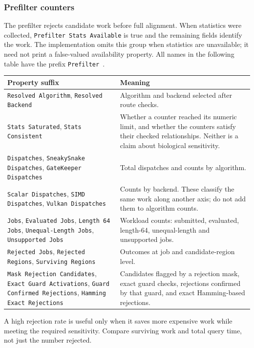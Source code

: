 \subsubsection{Prefilter counters}

The prefilter rejects candidate work before full alignment. When statistics
were collected, \texttt{Prefilter Stats Available} is true and the remaining
fields identify the work. The implementation omits this group when statistics
are unavailable; it need not print a false-valued availability property.
All names in the following table have the prefix \texttt{Prefilter }.

\begingroup\small
\begin{longtable}{@{}p{.49\linewidth}p{.46\linewidth}@{}}
\toprule
\textbf{Property suffix} & \textbf{Meaning}\\
\midrule\endhead
\texttt{Resolved Algorithm}, \texttt{Resolved Backend} & Algorithm and
backend selected after route checks.\\
\texttt{Stats Saturated}, \texttt{Stats Consistent} & Whether a counter
reached its numeric limit, and whether the counters satisfy their checked
relationships. Neither is a claim about biological sensitivity.\\
\texttt{Dispatches}, \texttt{SneakySnake Dispatches},
\texttt{GateKeeper Dispatches} & Total dispatches and counts by algorithm.\\
\texttt{Scalar Dispatches}, \texttt{SIMD Dispatches},
\texttt{Vulkan Dispatches} & Counts by backend. These classify the same
work along another axis; do not add them to algorithm counts.\\
\texttt{Jobs}, \texttt{Evaluated Jobs}, \texttt{Length 64 Jobs},
\texttt{Unequal-Length Jobs}, \texttt{Unsupported Jobs} & Workload counts:
submitted, evaluated, length-64, unequal-length and unsupported jobs.\\
\texttt{Rejected Jobs}, \texttt{Rejected Regions},
\texttt{Surviving Regions} & Outcomes at job and candidate-region level.\\
\texttt{Mask Rejection Candidates}, \texttt{Exact Guard Activations},
\texttt{Guard Confirmed Rejections}, \texttt{Hamming Exact Rejections}
& Candidates flagged by a rejection mask, exact guard checks, rejections
confirmed by that guard, and exact Hamming-based rejections.\\
\bottomrule
\end{longtable}
\endgroup

A high rejection rate is useful only when it saves more expensive work while
meeting the required sensitivity. Compare surviving work and total query time,
not just the number rejected.

